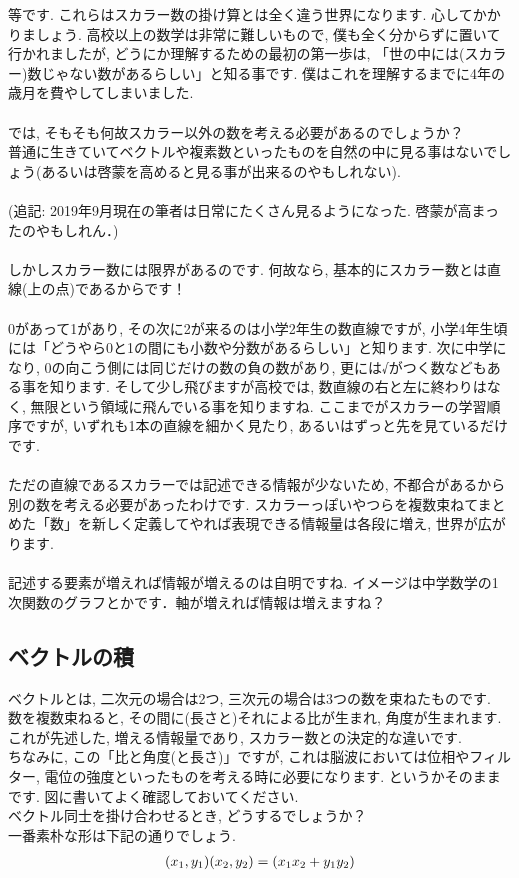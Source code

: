 \documentclass[11pt,a4paper]{jreport}
\begin{document}
等です. これらはスカラー数の掛け算とは全く違う世界になります. 心してかかりましょう. 高校以上の数学は非常に難しいもので, 僕も全く分からずに置いて行かれましたが, どうにか理解するための最初の第一歩は, 「世の中には(スカラー)数じゃない数があるらしい」と知る事です. 僕はこれを理解するまでに4年の歳月を費やしてしまいました. \\
\\
では, そもそも何故スカラー以外の数を考える必要があるのでしょうか？\\
普通に生きていてベクトルや複素数といったものを自然の中に見る事はないでしょう(あるいは啓蒙を高めると見る事が出来るのやもしれない).\\
\\
(追記: 2019年9月現在の筆者は日常にたくさん見るようになった. 啓蒙が高まったのやもしれん．)\\
\\
しかしスカラー数には限界があるのです. 何故なら, 基本的にスカラー数とは直線(上の点)であるからです！ \\
\\
0があって1があり, その次に2が来るのは小学2年生の数直線ですが, 小学4年生頃には「どうやら0と1の間にも小数や分数があるらしい」と知ります. 次に中学になり, 0の向こう側には同じだけの数の負の数があり, 更には√がつく数などもある事を知ります. そして少し飛びますが高校では, 数直線の右と左に終わりはなく, 無限という領域に飛んでいる事を知りますね. ここまでがスカラーの学習順序ですが, いずれも1本の直線を細かく見たり, あるいはずっと先を見ているだけです. \\
\\
ただの直線であるスカラーでは記述できる情報が少ないため, 不都合があるから別の数を考える必要があったわけです. スカラーっぽいやつらを複数束ねてまとめた「数」を新しく定義してやれば表現できる情報量は各段に増え, 世界が広がります. \\
\\
記述する要素が増えれば情報が増えるのは自明ですね. イメージは中学数学の1次関数のグラフとかです．軸が増えれば情報は増えますね？
\\
\subsection{ベクトルの積}
ベクトルとは, 二次元の場合は2つ, 三次元の場合は3つの数を束ねたものです. \\
数を複数束ねると, その間に(長さと)それによる比が生まれ, 角度が生まれます. \\
これが先述した, 増える情報量であり, スカラー数との決定的な違いです.\\
ちなみに, この「比と角度(と長さ)」ですが, これは脳波においては位相やフィルター, 電位の強度といったものを考える時に必要になります. というかそのままです. 図に書いてよく確認しておいてください. 
\\
ベクトル同士を掛け合わせるとき, どうするでしょうか？\\
一番素朴な形は下記の通りでしょう.\\
\begin{eqnarray}
(\mathstrut x_1 , \mathstrut y_1)(\mathstrut x_2 , \mathstrut y_2 ) = (\mathstrut x_1 \mathstrut x_2 + \mathstrut y_1 \mathstrut y_2)
\end{eqnarray}
\end{document}
